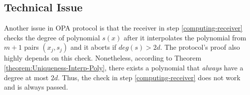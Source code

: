 \subsection{Technical Issue } Another issue in OPA protocol is that the receiver in step \ref{computing-receiver} checks the degree of  polynomial $s(x)$ after it interpolates the polynomial from $m+1$ pairs $(x_{\scriptscriptstyle j},s_{\scriptscriptstyle j} )$ and it aborts if $deg(s)>2d$. The protocol's proof also highly depends on this check. Nonetheless,  according to Theorem \ref{theorem:Uniqueness-Interp-Poly}, there exists a  polynomial that  \emph{always} have a degree at most $2d$. Thus, the check in step \ref{computing-receiver}  does not work and is always passed.



